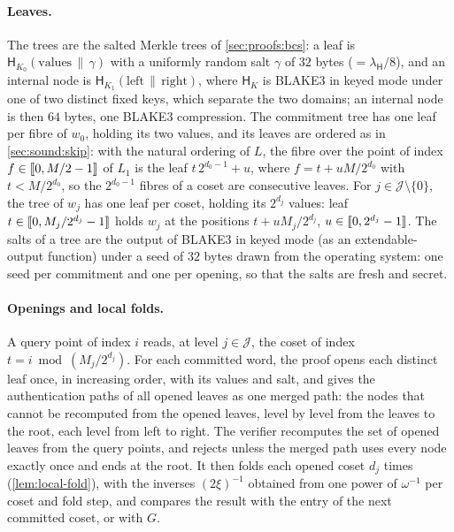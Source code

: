 \paragraph{Leaves.}
The trees are the salted Merkle trees of \cref{sec:proofs:bcs}: a leaf is $\mathsf{H}_{K_0}(\text{values} \,\|\, \gamma)$ with a uniformly random salt $\gamma$ of $32$ bytes ($= \lambda_{\mathsf{H}}/8$), and an internal node is $\mathsf{H}_{K_1}(\text{left} \,\|\, \text{right})$, where $\mathsf{H}_K$ is BLAKE3 in keyed mode under one of two distinct fixed keys, which separate the two domains; an internal node is then $64$ bytes, one BLAKE3 compression.
The commitment tree has one leaf per fibre of $w_0$, holding its two values, and its leaves are ordered as in \cref{sec:sound:skip}: with the natural ordering of $L$, the fibre over the point of index $f \in \llbracket 0, M/2 - 1 \rrbracket$ of $L_1$ is the leaf $t\,2^{d_0-1} + u$, where $f = t + u M/2^{d_0}$ with $t < M/2^{d_0}$, so the $2^{d_0-1}$ fibres of a coset are consecutive leaves.
For $j \in \mathcal{J} \setminus \{0\}$, the tree of $w_j$ has one leaf per coset, holding its $2^{d_j}$ values: leaf $t \in \llbracket 0, M_j/2^{d_j} - 1 \rrbracket$ holds $w_j$ at the positions $t + u M_j / 2^{d_j}$, $u \in \llbracket 0, 2^{d_j} - 1 \rrbracket$.
The salts of a tree are the output of BLAKE3 in keyed mode (as an extendable-output function) under a seed of $32$ bytes drawn from the operating system: one seed per commitment and one per opening, so that the salts are fresh and secret.

\paragraph{Openings and local folds.}
A query point of index $i$ reads, at level $j \in \mathcal{J}$, the coset of index $t = i \bmod (M_j/2^{d_j})$.
For each committed word, the proof opens each distinct leaf once, in increasing order, with its values and salt, and gives the authentication paths of all opened leaves as one merged path: the nodes that cannot be recomputed from the opened leaves, level by level from the leaves to the root, each level from left to right.
The verifier recomputes the set of opened leaves from the query points, and rejects unless the merged path uses every node exactly once and ends at the root.
It then folds each opened coset $d_j$ times (\cref{lem:local-fold}), with the inverses $(2\xi)^{-1}$ obtained from one power of $\omega^{-1}$ per coset and fold step, and compares the result with the entry of the next committed coset, or with $G$.

